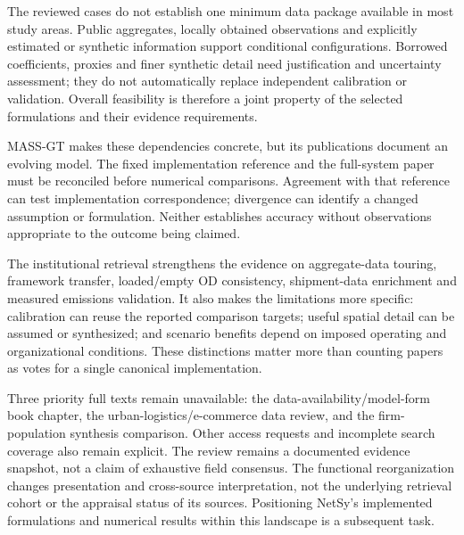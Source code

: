 The reviewed cases do not establish one minimum data package available in most
study areas. Public aggregates, locally obtained observations and explicitly
estimated or synthetic information support conditional configurations.
Borrowed coefficients, proxies and finer synthetic detail need justification
and uncertainty assessment; they do not automatically replace independent
calibration or validation. Overall feasibility is therefore a joint property
of the selected formulations and their evidence requirements.

MASS-GT makes these dependencies concrete, but its publications document an
evolving model. The fixed implementation reference and the full-system paper
must be reconciled before numerical comparisons. Agreement with that reference
can test implementation correspondence; divergence can identify a changed
assumption or formulation. Neither establishes accuracy without observations
appropriate to the outcome being claimed.

The institutional retrieval strengthens the evidence on aggregate-data touring,
framework transfer, loaded/empty OD consistency, shipment-data enrichment and
measured emissions validation. It also makes the limitations more specific:
calibration can reuse the reported comparison targets; useful spatial detail can
be assumed or synthesized; and scenario benefits depend on imposed operating
and organizational conditions. These distinctions matter more than counting
papers as votes for a single canonical implementation.

Three priority full texts remain unavailable: the data-availability/model-form
book chapter, the urban-logistics/e-commerce data review, and the firm-population
synthesis comparison. Other access requests and incomplete search coverage also
remain explicit. The review remains a documented evidence snapshot, not a
claim of exhaustive field consensus. The functional reorganization changes
presentation and cross-source interpretation, not the underlying retrieval
cohort or the appraisal status of its sources. Positioning NetSy's implemented
formulations and numerical results within this landscape is a subsequent task.
